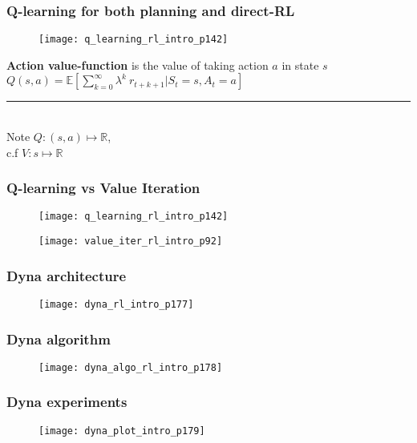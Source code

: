 \begin{frame}
\frametitle{Q-learning for both planning and direct-RL}
\begin{figure}
    \centering
    \texttt{[image: q\_learning\_rl\_intro\_p142]}
\end{figure}
\pause

\textbf{Action value-function} is the value of taking action $a$ in state $s$ \\
$Q(s,a) = \mathbb{E} [\sum_{k=0}^{\infty} \lambda^k~r_{t+k+1} | S_t = s, A_t = a]$\\
\noindent\rule{5cm}{0.4pt}\\
Note $Q:(s,a) \mapsto \mathbb{R}$,\\
\hspace{2mm} c.f $V: s \mapsto \mathbb{R}$
\pause

\end{frame}

\begin{frame}
\frametitle{Q-learning vs Value Iteration}
\begin{figure}
    \centering
    \texttt{[image: q\_learning\_rl\_intro\_p142]}
\end{figure}

\begin{figure}
    \centering
    \texttt{[image: value\_iter\_rl\_intro\_p92]}
\end{figure}
\end{frame}

\begin{frame}
\frametitle{Dyna architecture}
\begin{figure}
    \centering
    \texttt{[image: dyna\_rl\_intro\_p177]}
\end{figure}
\end{frame}

\begin{frame}
\frametitle{Dyna algorithm}
\begin{figure}
    \centering
    \texttt{[image: dyna\_algo\_rl\_intro\_p178]}
\end{figure}
\end{frame}

\begin{frame}
\frametitle{Dyna experiments}
\begin{figure}
    \centering
    \texttt{[image: dyna\_plot\_intro\_p179]}
\end{figure}
\end{frame}

